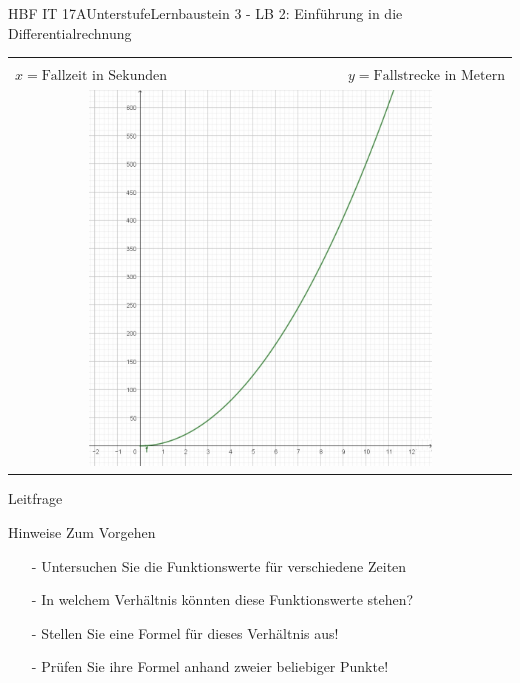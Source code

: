 \documentclass[oneside,openany,headings=optiontotoc,11pt,numbers=noenddot]{scrreprt}
\begin{document}
	\begin{worksheet}{HBF IT 17A}{Unterstufe}{Lernbaustein 3 - LB 2: Einführung in die Differentialrechnung}
		
		\noindent
		\begin{framed}
			\begin{center}
				\begin{tabular}{lcr}				
					\multicolumn{3}{c}{\fbox{\(f(x) = 5x^{2}\)}}\\
					\( x = \text{Fallzeit in Sekunden}\) &  & \( y = \text{Fallstrecke in Metern}\)\\
					\multicolumn{3}{c}{\includegraphics[width=0.7\textwidth]{20180219-EinDiffFall.jpg}}
				\end{tabular}
			\end{center}
		\end{framed}

		\setlength{\fboxsep}{1mm}
		\begin{framed}
			\tiny{\color{codegray}Leitfrage}\\
			\par
			\bigskip
		\end{framed}
	
		\begin{framed}
			\tiny{\color{codegray}Hinweise Zum Vorgehen}
			\normalsize
			\color{black}
				\begin{itemize}
					\itemsep0em
					\item[-] Untersuchen Sie die Funktionswerte für verschiedene Zeiten\\
					\item[-] In welchem Verhältnis könnten diese Funktionswerte stehen?\\
					\item[-] Stellen Sie eine Formel für dieses Verhältnis aus!\\
					\item[-] Prüfen Sie ihre Formel anhand zweier beliebiger Punkte!
				\end{itemize}
		\end{framed}
	

\end{worksheet}
\end{document}
